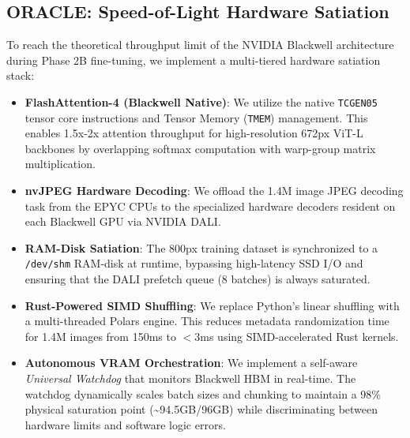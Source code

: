 \documentclass[10pt,twocolumn,letterpaper]{article}
\begin{document}
\subsection{ORACLE: Speed-of-Light Hardware Satiation}
To reach the theoretical throughput limit of the NVIDIA Blackwell architecture during Phase 2B fine-tuning, we implement a multi-tiered hardware satiation stack:
\begin{itemize}
    \item \textbf{FlashAttention-4 (Blackwell Native)}: We utilize the native \texttt{TCGEN05} tensor core instructions and Tensor Memory (\texttt{TMEM}) management. This enables 1.5x-2x attention throughput for high-resolution 672px ViT-L backbones by overlapping softmax computation with warp-group matrix multiplication.
    \item \textbf{nvJPEG Hardware Decoding}: We offload the 1.4M image JPEG decoding task from the EPYC CPUs to the specialized hardware decoders resident on each Blackwell GPU via NVIDIA DALI.
    \item \textbf{RAM-Disk Satiation}: The 800px training dataset is synchronized to a \texttt{/dev/shm} RAM-disk at runtime, bypassing high-latency SSD I/O and ensuring that the DALI prefetch queue (8 batches) is always saturated.
    \item \textbf{Rust-Powered SIMD Shuffling}: We replace Python's linear shuffling with a multi-threaded Polars engine. This reduces metadata randomization time for 1.4M images from 150ms to \(<\)3ms using SIMD-accelerated Rust kernels.
    \item \textbf{Autonomous VRAM Orchestration}: We implement a self-aware \textit{Universal Watchdog} that monitors Blackwell HBM in real-time. The watchdog dynamically scales batch sizes and chunking to maintain a 98\% physical saturation point (\textasciitilde 94.5GB/96GB) while discriminating between hardware limits and software logic errors.
\end{itemize}
\end{document}
